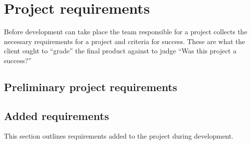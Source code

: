\section{Project requirements}

Before development can take place the team responsible for a project collects the necessary requirements for a project and criteria for success.
These are what the client ought to ``grade'' the final product against to judge ``Was this project a success?''

\subsection{Preliminary project requirements}









\subsection{Added requirements}

This section outlines requirements added to the project during development.

